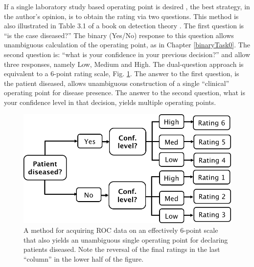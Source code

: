 \documentclass[
]{book}
\begin{document}
If a single laboratory study based operating point is desired \citep{RN2660}, the best strategy, in the author's opinion, is to obtain the rating via two questions. This method is also illustrated in Table 3.1 of a book on detection theory \citep{RN1318}. The first question is ``is the case diseased?'' The binary (Yes/No) response to this question allows unambiguous calculation of the operating point, as in Chapter \ref{binaryTask0}. The second question is: ``what is your confidence in your previous decision?'' and allow three responses, namely Low, Medium and High. The dual-question approach is equivalent to a 6-point rating scale, Fig. \ref{fig:SixPointScale}. The answer to the first question, is the patient diseased, allows unambiguous construction of a single ``clinical'' operating point for disease presence. The answer to the second question, what is your confidence level in that decision, yields multiple operating points.

\begin{figure}
\centering
\includegraphics{images/AcquiringData6PointScale.png}
\caption{\label{fig:SixPointScale}A method for acquiring ROC data on an effectively 6-point scale that also yields an unambiguous single operating point for declaring patients diseased. Note the reversal of the final ratings in the last ``column'' in the lower half of the figure.}
\end{figure}
\end{document}
